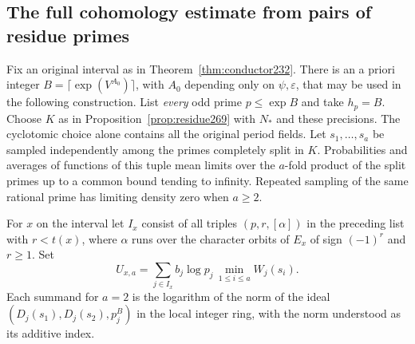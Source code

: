 \documentclass[a4paper,11pt]{article}
\theoremstyle{definition}
\theoremstyle{remark}
\numberwithin{equation}{section}
\begin{document}
\subsection{The full cohomology estimate from pairs of residue primes}\label{nav:I-60}
Fix an original interval as in Theorem~\ref{thm:conductor232}.
There is an a priori integer \(B=\lceil\exp(V^{A_0})\rceil\),
with \(A_0\) depending only on \(\psi,\varepsilon\), that may
be used in the following construction. List \emph{every} odd
prime \(p\le\exp B\) and take \(h_p=B\). Choose \(K\) as in
Proposition~\ref{prop:residue269} with \(N_*\) and these
precisions. The cyclotomic choice alone contains all the
original period fields. Let \(s_1,\ldots,s_a\) be sampled
independently among the primes completely split in \(K\).
Probabilities and averages of functions of this tuple mean
limits over the \(a\)-fold product of the split primes up to
a common bound tending to infinity. Repeated sampling of the
same rational prime has limiting density zero when \(a\ge2\).

For \(x\) on the interval let \(I_x\) consist of all triples
\((p,r,[\alpha])\) in the preceding list with \(r<t(x)\),
where \(\alpha\) runs over the character orbits of \(E_x\)
of sign \((-1)^r\) and \(r\ge1\). Set
\[
 U_{x,a}=\sum_{j\in I_x}b_j\log p_j\,
                       \min_{1\le i\le a}W_j(s_i).
\]
Each summand for \(a=2\) is the logarithm of the norm of
the ideal \((D_j(s_1),D_j(s_2),p_j^B)\) in the local integer
ring, with the norm understood as its additive index.
\end{document}
